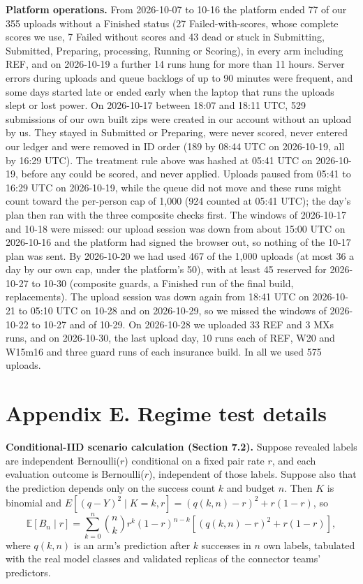 \documentclass[
]{article}
\begin{document}
\textbf{Platform operations.} From 2026-10-07 to 10-16 the platform
ended 77 of our 355 uploads without a Finished status (27
Failed-with-scores, whose complete scores we use, 7 Failed without
scores and 43 dead or stuck in Submitting, Submitted, Preparing,
processing, Running or Scoring), in every arm including REF, and on
2026-10-19 a further 14 runs hung for more than 11 hours. Server errors
during uploads and queue backlogs of up to 90 minutes were frequent, and
some days started late or ended early when the laptop that runs the
uploads slept or lost power. On 2026-10-17 between 18:07 and 18:11 UTC,
529 submissions of our own built zips were created in our account
without an upload by us. They stayed in Submitted or Preparing, were
never scored, never entered our ledger and were removed in ID order (189
by 08:44 UTC on 2026-10-19, all by 16:29 UTC). The treatment rule above
was hashed at 05:41 UTC on 2026-10-19, before any could be scored, and
never applied. Uploads paused from 05:41 to 16:29 UTC on 2026-10-19,
while the queue did not move and these runs might count toward the
per-person cap of 1,000 (924 counted at 05:41 UTC); the day's plan then
ran with the three composite checks first. The windows of 2026-10-17 and
10-18 were missed: our upload session was down from about 15:00 UTC on
2026-10-16 and the platform had signed the browser out, so nothing of
the 10-17 plan was sent. By 2026-10-20 we had used 467 of the 1,000
uploads (at most 36 a day by our own cap, under the platform's 50), with
at least 45 reserved for 2026-10-27 to 10-30 (composite guards, a
Finished run of the final build, replacements). The upload session was
down again from 18:41 UTC on 2026-10-21 to 05:10 UTC on 10-28 and on
2026-10-29, so we missed the windows of 2026-10-22 to 10-27 and of
10-29. On 2026-10-28 we uploaded 33 REF and 3 MXs runs, and on
2026-10-30, the last upload day, 10 runs each of REF, W20 and W15m16 and
three guard runs of each insurance build. In all we used 575 uploads.

\section{Appendix E. Regime test
details}\label{appendix-e.-regime-test-details}

\textbf{Conditional-IID scenario calculation (Section 7.2).} Suppose
revealed labels are independent Bernoulli(\(r\)) conditional on a fixed
pair rate \(r\), and each evaluation outcome is Bernoulli(\(r\)),
independent of those labels. Suppose also that the prediction depends
only on the success count \(k\) and budget \(n\). Then \(K\) is binomial
and \(E[(q-Y)^2\mid K=k,r]=(q(k,n)-r)^2+r(1-r)\), so
\[\mathbb{E}[B_n \mid r] = \sum_{k=0}^{n} \binom{n}{k} r^k (1 - r)^{n-k}\left[(q(k, n) - r)^2 + r(1 - r)\right],\]
where \(q(k, n)\) is an arm's prediction after \(k\) successes in \(n\)
own labels, tabulated with the real model classes and validated replicas
of the connector teams' predictors.
\end{document}
